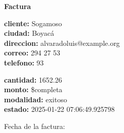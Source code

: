 \documentclass{article}
\begin{document}
\begin{center}
    {\LARGE \textbf{Factura}}\\[1cm]
\end{center}

\textbf{cliente:} Sogamoso \\
\textbf{ciudad:} Boyacá \\
\textbf{direccion:} alvaradoluis@example.org \\
\textbf{correo:} 294 27 53 \\
\textbf{telefono:} 93 \\

\vspace{0.5cm}

\textbf{cantidad:} 1652.26 \\
\textbf{monto:} \$completa \\
\textbf{modalidad:} exitoso \\
\textbf{estado:} 2025-01-22 07:06:49.925798 \\

\vspace{1cm}

Fecha de la factura: 
\end{document}
